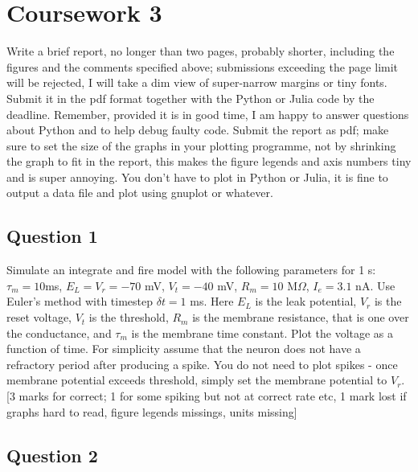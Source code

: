 \documentclass[12pt]{article}
\begin{document}
\section*{Coursework 3}

Write a brief report, no longer than two pages, probably shorter,
including the figures and the comments specified above; submissions
exceeding the page limit will be rejected, I will take a dim view of
super-narrow margins or tiny fonts. Submit it in the pdf format
together with the Python or Julia code by the deadline. Remember,
provided it is in good time, I am happy to answer questions about
Python and to help debug faulty code. Submit the report as pdf; make
sure to set the size of the graphs in your plotting programme, not by
shrinking the graph to fit in the report, this makes the figure
legends and axis numbers tiny and is super annoying. You don't have to
plot in Python or Julia, it is fine to output a data file and plot
using gnuplot or whatever.

\subsection*{Question 1}

Simulate an integrate and fire model with the following parameters for
1 s: $\tau_m = 10 $ms, $E_L = V_r = -70$ mV, $V_t = -40$ mV, $R_m= 10$
M$\Omega$, $I_e = 3.1 $ nA. Use Euler's method with timestep $\delta t
= 1$ ms. Here $E_L$ is the leak potential, $V_r$ is the reset voltage,
$V_t$ is the threshold, $R_m$ is the membrane resistance, that is one
over the conductance, and $\tau_m$ is the membrane time constant. Plot
the voltage as a function of time. For simplicity assume that the
neuron does not have a refractory period after producing a spike. You
do not need to plot spikes - once membrane potential exceeds
threshold, simply set the membrane potential to $V_r$. [3 marks for
  correct; 1 for some spiking but not at correct rate etc, 1 mark lost
  if graphs hard to read, figure legends missings, units missing]

\subsection*{Question 2}
\end{document}
